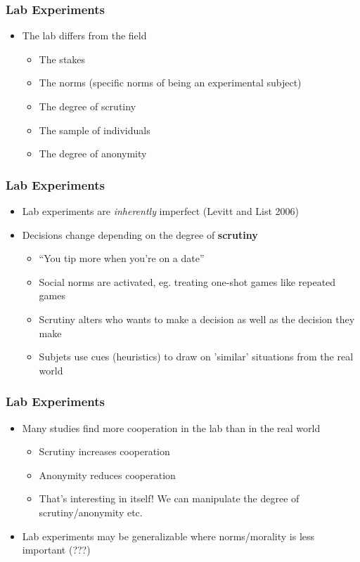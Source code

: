 \documentclass[xcolor=x11names,compress]{beamer}\usepackage[]{graphicx}\usepackage[]{color}
\renewcommand{\(}{\begin{columns}}
\renewcommand{\)}{\end{columns}}
\newcommand{\<}[1]{\begin{column}{#1}}
\renewcommand{\>}{\end{column}}
\begin{document}
\begin{frame}
\frametitle{Lab Experiments}
\begin{itemize}
\item The lab differs from the field 
\pause
\begin{itemize}
\item The stakes
\pause
\item The norms (specific norms of being an experimental subject)
\pause
\item The degree of scrutiny
\pause
\item The sample of individuals
\pause
\item The degree of anonymity
\end{itemize}
\end{itemize}
\end{frame}

\begin{frame}
\frametitle{Lab Experiments}
\begin{itemize}
\item Lab experiments are \textit{inherently} imperfect (Levitt and List 2006)
\pause
\item Decisions change depending on the degree of \textbf{scrutiny}
\pause
\begin{itemize}
\item ``You tip more when you're on a date''
\pause
\item Social norms are activated, eg. treating one-shot games like repeated games
\pause
\item Scrutiny alters who wants to make a decision as well as the decision they make
\pause
\item Subjets use cues (heuristics) to draw on 'similar' situations from the real world
\end{itemize}
\end{itemize}
\end{frame}

\begin{frame}
\frametitle{Lab Experiments}
\begin{itemize}
\item Many studies find more cooperation in the lab than in the real world
\pause
\begin{itemize}
\item Scrutiny increases cooperation
\pause
\item Anonymity reduces cooperation
\pause
\item That's interesting in itself! We can manipulate the degree of scrutiny/anonymity etc.
\end{itemize}
\pause
\item Lab experiments may be generalizable where norms/morality is less important (???)
\end{itemize}
\end{frame}
\end{document}
